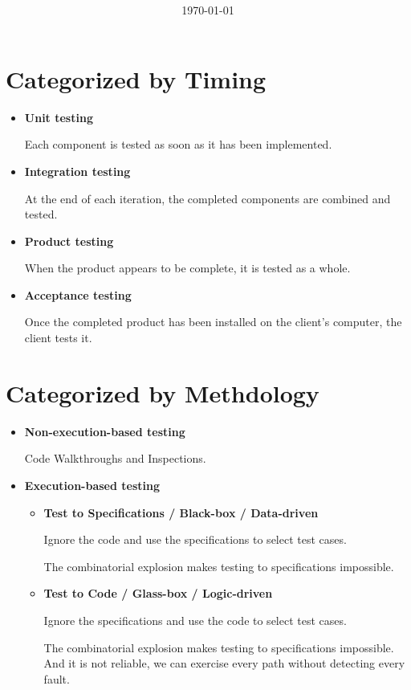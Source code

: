 \documentclass[11pt]{article}
\title{\textbf{\Topic}}
\author{\Name}
\date{\today}
\begin{document}
\maketitle
\noindent\makebox[\linewidth]{\rule[8pt]{5in}{0.5pt}}

\section*{Categorized by Timing}

\begin{itemize}
	\item \textbf{Unit testing}
	
	Each component is tested as soon as it has been implemented.
	
	\item \textbf{Integration testing}
	
	At the end of each iteration, the completed components are combined and tested.
	
	\item \textbf{Product testing}
	
	When the product appears to be complete, it is tested as a whole.
	
	\item \textbf{Acceptance testing}
	
	Once the completed product has been installed on the client’s computer, the client tests it.
\end{itemize}

\section*{Categorized by Methdology}

\begin{itemize}
	\item \textbf{Non-execution-based testing}	
	
	Code Walkthroughs and Inspections.

	\item \textbf{Execution-based testing}
	
	\begin{itemize}
	
	\item \textbf{Test to Specifications / Black-box / Data-driven}
	
	Ignore the code and use the specifications to select test cases.
	
	The combinatorial explosion makes testing to specifications impossible.
	
	\item \textbf{Test to Code / Glass-box / Logic-driven}
	
	Ignore the specifications and use the code to select test cases.
	
	The combinatorial explosion makes testing to specifications impossible. And it is not reliable, we can exercise every path without detecting every fault.
	
	\end{itemize}
	
\end{itemize}
\end{document}
